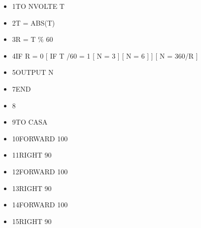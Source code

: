 \vskip 1cm

\begin{minipage}{1.0\textwidth}
\begin{itemize}[itemsep=-3pt,parsep=2pt]
\item[] \hspace{0.5cm}  1\hspace{8pt}TO NVOLTE T
\item[] \hspace{0.5cm}  2\hspace{8pt}\hspace{8pt}T = ABS(T)
\item[] \hspace{0.5cm}	3\hspace{8pt}\hspace{8pt}R = T \% 60
\item[] \hspace{0.5cm}  4\hspace{8pt}\hspace{8pt}IF R = 0 [ IF T /60 = 1 [ N = 3 ] [ N = 6 ] ] [ N = 360/R ]
\item[] \hspace{0.5cm}  5\hspace{8pt}\hspace{8pt}OUTPUT N
\item[] \hspace{0.5cm}  7\hspace{8pt}END
\item[] \hspace{0.5cm}  8
\item[] \hspace{0.5cm}  9\hspace{8pt}TO CASA
\item[] \hspace{0.3cm} 10\hspace{8pt}FORWARD 100 
\item[] \hspace{0.3cm} 11\hspace{8pt}RIGHT 90 
\item[] \hspace{0.3cm} 12\hspace{8pt}FORWARD 100 
\item[] \hspace{0.3cm} 13\hspace{8pt}RIGHT 90 
\item[] \hspace{0.3cm} 14\hspace{8pt}FORWARD 100 
\item[] \hspace{0.3cm} 15\hspace{8pt}RIGHT 90 

\end{itemize}
\end{minipage}
